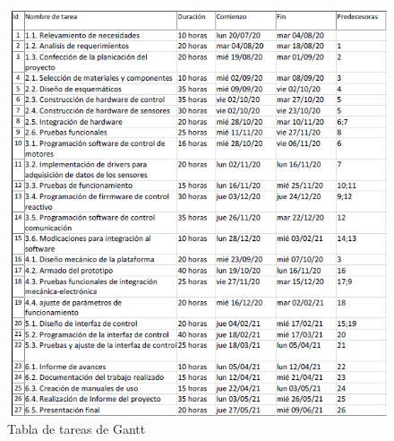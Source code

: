 \begin{figure}[htpb]
\centering 
\includegraphics[width=\textwidth]{./Figures/gantttabla.PNG}
\caption{Tabla de tareas de Gantt}
\label{fig:gantt1}
\end{figure}

